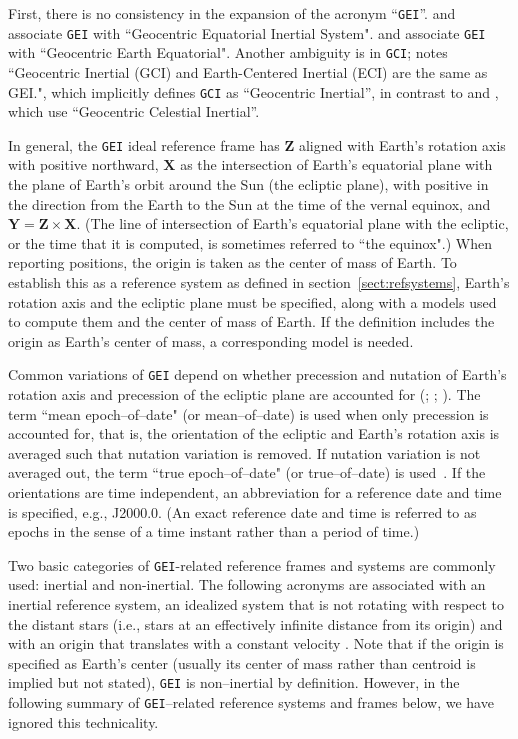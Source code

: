 \documentclass[draft]{agujournal2019}
\begin{document}
First, there is no consistency in the expansion of the acronym ``\texttt{GEI}''.  and  associate \texttt{GEI} with ``Geocentric Equatorial Inertial System".  and  associate \texttt{GEI} with ``Geocentric Earth Equatorial". Another ambiguity is in \texttt{GCI};  notes ``Geocentric Inertial (GCI) and Earth-Centered Inertial (ECI) are the same as GEI.", which implicitly defines \texttt{GCI} as ``Geocentric Inertial'', in contrast to  and
, which use ``Geocentric Celestial Inertial''. 

In general, the \texttt{GEI} ideal reference frame has $\mathbf{Z}$ aligned with Earth's rotation axis with positive northward, $\mathbf{X}$ as the intersection of Earth's equatorial plane with the plane of Earth's orbit around the Sun (the ecliptic plane), with positive in the direction from the Earth to the Sun at the time of the vernal equinox, and $\mathbf{Y}=\mathbf{Z}\times\mathbf{X}$. (The line of intersection of Earth's equatorial plane with the ecliptic, or the time that it is computed, is sometimes referred to ``the equinox".) When reporting positions, the origin is taken as the center of mass of Earth. To establish this as a reference system as defined in section~\ref{sect:refsystems}, Earth's rotation axis and the ecliptic plane must be specified, along with a models used to compute them and the center of mass of Earth. If the definition includes the origin as Earth's center of mass, a corresponding model is needed.

Common variations of \texttt{GEI} depend on whether precession and nutation of Earth's rotation axis and precession of the ecliptic plane are accounted for (; ; ). The term ``mean epoch--of--date" (or mean--of--date) is used when only precession is accounted for, that is, the orientation of the ecliptic and Earth's rotation axis is averaged such that nutation variation is removed. If nutation variation is not averaged out, the term ``true epoch--of--date" (or true--of--date) is used~\cite{Hapgood1995}. If the orientations are time independent, an abbreviation for a reference date and time is specified, e.g., J2000.0. (An exact reference date and time is referred to as epochs in the sense of a time instant rather than a period of time.)

Two basic categories of \texttt{GEI}-related reference frames and systems are commonly used: inertial and non-inertial. The following acronyms are associated with an inertial reference system, an idealized system that is not rotating with respect to the distant stars (i.e., stars at an effectively infinite distance from its origin) and with an origin that translates with a constant velocity \cite{NAIFOverview2023}. Note that if the origin is specified as Earth's center (usually its center of mass rather than centroid is implied but not stated), \texttt{GEI} is non--inertial by definition. However, in the following summary of \texttt{GEI}--related reference systems and frames below, we have ignored this technicality.
\end{document}
